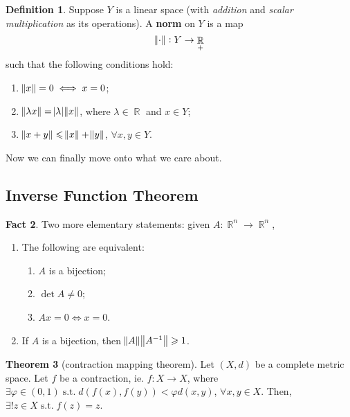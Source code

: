 \documentclass{amsart} %
\theoremstyle{mytheoremstyle}
\theoremstyle{definition}
\newtheorem{definition}{Definition}[section]
\newtheorem{theorem}[definition]{Theorem}
\newtheorem{fact}[definition]{Fact}
\numberwithin{equation}{section}
\DeclareMathOperator{\R}{\mathbb{R}}
\DeclareMathOperator{\1}{\mathbbm{1}}
\DeclareMathOperator{\suchthat}{\text{ s.t. }}
\renewcommand{\leq}{\leqslant}
\renewcommand{\geq}{\geqslant}
\renewcommand{\leq}{\leqslant}
\renewcommand{\geq}{\geqslant}
\begin{document}
\begin{definition}
	Suppose $Y$ is a linear space (with \textit{addition} and \textit{scalar multiplication} as its operations). A \textbf{norm} on $Y$ is a map
	$$ \norm{\cdot} : Y \to \R_{+}  $$
	such that the following conditions hold:
	\begin{enumerate}[label=(\arabic*)]
		\item $\norm{x} = 0 \iff x = 0$;
		\item $\norm{\lambda x} = \abs{\lambda} \norm{x} $, where $\lambda \in \R$ and $x \in Y$;
		\item $\norm{x+y} \leq \norm{x} + \norm{y} $, $\forall x,y \in Y$.
	\end{enumerate}
\end{definition}

Now we can finally move onto what we care about.

\subsection{Inverse Function Theorem}

\begin{fact}
	Two more elementary statements: given $A : \R^n \to \R^n$,
	\begin{enumerate}[label=(\arabic*)]
		\item The following are equivalent:
		\begin{enumerate}
			\item $A$ is a bijection;
			\item $\det A \neq 0$;
			\item $Ax = 0 \iff x=0$.
		\end{enumerate}
		
		\item If $A$ is a bijection, then $\norm{A} \norm{A^{-1}} \geq 1$.
	\end{enumerate}
\end{fact}

\begin{theorem}[contraction mapping theorem]
	\label{thmcontractionmapping}
	Let $(X,d)$ be a complete metric space. Let $f $ be a contraction, ie. $f: X \to X$, where $\exists \varphi \in (0,1) \suchthat d(f(x),f(y)) < \varphi d(x,y)$, $\forall x,y \in X$. Then, $\exists! z \in X \suchthat f(z) = z$.
\end{theorem}
\end{document}

